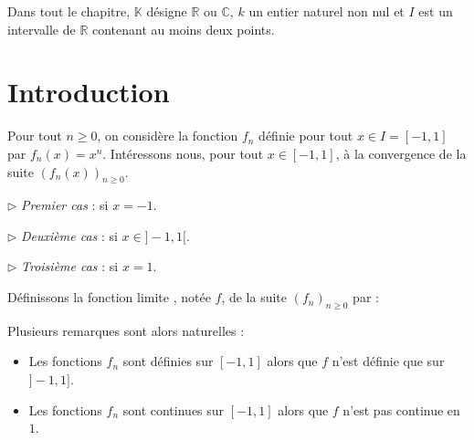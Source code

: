\documentclass[french,11pt,twoside]{VcCours}
\begin{document}

\tableofcontents
\separationTitre

Dans tout le chapitre, $\mathbb{K}$ désigne $\mathbb{R}$ ou $\mathbb{C}$, $k$ un entier naturel non nul et $I$ est un intervalle de $\mathbb{R}$ contenant au moins deux points.


\section{Introduction} 

Pour tout $n \geq 0$, on considère la fonction $f_n$ définie pour tout $x \in I= [-1,1]$ par $f_n(x)=x^n$. Intéressons nous, pour tout $x \in [-1,1]$, à la convergence de la suite $(f_n(x))_{n \geq 0}$.


$\rhd$ \emph{Premier cas} : si $x=-1$.

%

\vspace*{2.5cm}
$\rhd$ \emph{Deuxième cas} : si $x \in ]-1,1[$.
%

\vspace*{2.5cm}


$\rhd$ \emph{Troisième cas} : si $x=1$.
%
%
\vspace*{2.5cm}

Définissons la fonction \og limite \fg, notée $f$, de la suite $(f_n)_{n \geq 0}$ par :

\vspace*{2.5cm}

Plusieurs remarques sont alors naturelles : 

\begin{itemize}
\item Les fonctions $f_n$ sont définies sur $[-1,1]$ alors que $f$ n'est définie que sur $]-1,1]$.
\item Les fonctions $f_n$ sont continues sur $[-1,1]$ alors que $f$ n'est pas continue en $1$.
\end{itemize}
\end{document}
